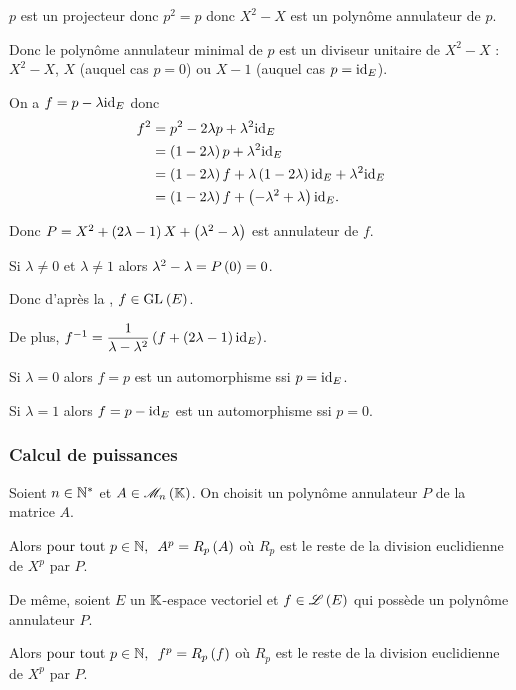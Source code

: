 \begin{corr}
\(p\) est un projecteur donc \(p^2=p\) donc \(X^2-X\) est un polynôme annulateur de \(p\).

Donc le polynôme annulateur minimal de \(p\) est un diviseur unitaire de \(X^2-X\) : \(X^2-X\), \(X\) (auquel cas \(p=0\)) ou \(X-1\) (auquel cas \(p=\mathrm{id}_{E}\)).

On a \(f=p-\lambda\mathrm{id}_{E}\) donc \[\begin{aligned}
f^2&=p^2-2\lambda p+\lambda^2\mathrm{id}_{E} \\
&=\left(1-2\lambda\right)p+\lambda^2\mathrm{id}_{E} \\
&=\left(1-2\lambda\right)f+\lambda\left(1-2\lambda\right)\mathrm{id}_{E}+\lambda^2\mathrm{id}_{E} \\
&=\left(1-2\lambda\right)f+\left(-\lambda^2+\lambda\right)\mathrm{id}_{E}.
\end{aligned}\]

Donc \(P=X^2+\left(2\lambda-1\right)X+\left(\lambda^2-\lambda\right)\) est annulateur de \(f\).

Si \(\lambda\not=0\) et \(\lambda\not=1\) alors \(\lambda^2-\lambda=P\left(0\right)=0\).

Donc d'après la , \(f\in\GL{}[E]\).

De plus, \(f^{-1}=\dfrac{1}{\lambda-\lambda^2}\left(f+\left(2\lambda-1\right)\mathrm{id}_{E}\right)\).

Si \(\lambda=0\) alors \(f=p\) est un automorphisme ssi \(p=\mathrm{id}_{E}\).

Si \(\lambda=1\) alors \(f=p-\mathrm{id}_{E}\) est un automorphisme ssi \(p=0\).
\end{corr}

\subsubsection{Calcul de puissances}

\begin{prop}
Soient \(n\in\mathbb{N}^*\) et \(A\in\M{n}\). On choisit un polynôme annulateur \(P\) de la matrice \(A\).

Alors \(\quantifs{\tpt p\in\N}A^p=R_p\paren{A}\) où \(R_p\) est le reste de la division euclidienne de \(X^p\) par \(P\).

De même, soient \(E\) un \(\mathbb{K}\)-espace vectoriel et \(f\in\mathscr{L}\left(E\right)\) qui possède un polynôme annulateur \(P\).

Alors \(\quantifs{\tpt p\in\N}f^p=R_p\paren{f}\) où \(R_p\) est le reste de la division euclidienne de \(X^p\) par \(P\).
\end{prop}


